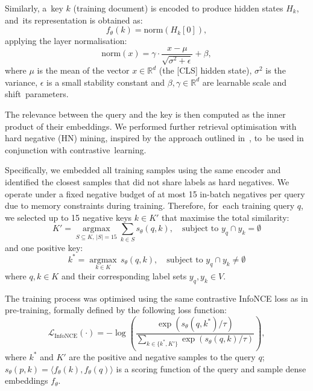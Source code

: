 \documentclass[make,article,accept,pdftex,moreauthors]{Definitions/mdpi}
\begin{document}
Similarly, a~key $k$ (training document) is encoded to produce hidden states $H_k$, and~its representation is obtained as:
\begin{equation}
f_{\theta}(k) = \text{norm}(H_k[0]),
\end{equation}
applying the layer normalisation:
\begin{equation}
\text{norm}(x) = \gamma \cdot \frac{x - \mu}{\sqrt{\sigma^2 + \epsilon}} + \beta,
\end{equation}
where $\mu$ is the mean of the vector $x \in \mathbb{R}^d$ (the [CLS] hidden state), $\sigma^2$ is the variance, $\epsilon$ is a small stability constant and $\beta, \gamma \in \mathbb{R}^d$ are learnable scale and shift~parameters.

The relevance between the query and the key is then computed as the inner product of their embeddings.
We performed further retrieval optimisation with hard negative (HN) mining, inspired by the approach outlined in~\citep{xiong2021ance}, to~be used in conjunction with contrastive~learning.

Specifically, we embedded all training samples using the same encoder and identified the closest samples that did not share labels as hard negatives. 
We operate under a fixed negative budget of at most 15 in-batch negatives per query due to memory constraints during training.
Therefore, for~each training query $q$, we selected up to 15 negative keys $k \in K'$ that maximise the total similarity:
\begin{equation}
K' = \underset{S \subseteq K,\, |S| = 15}{\operatorname{argmax}} \sum_{k \in S} s_\theta(q, k), \quad \text{subject to } y_q \cap y_k = \emptyset
\end{equation}
and one positive key:
\begin{equation}
k^* = \underset{k \in K}{\operatorname{argmax}}\, s_\theta(q, k), \quad \text{subject to } y_q \cap y_k \neq \emptyset
\end{equation}
where $q, k \in K$ and their corresponding label sets $y_q, y_k \in V$.

The training process was optimised using the same contrastive \mbox{InfoNCE} loss as in pre-training, formally defined by the following loss function:
\begin{equation}
\mathcal{L}_{\operatorname{InfoNCE}}(\cdot) = - \log \left( \frac{\exp(s_{\theta}(q, k^*)/\tau)}{\sum_{k \in \{k^*, K'\}} \exp(s_{\theta}(q, k)/\tau)} \right),
\end{equation}
where $k^*$ and $K'$ are the positive and negative samples to the query $q$; $s_{\theta}(p, k) = \langle f_{\theta}(k), f_{\theta}(q) \rangle$ is a scoring function of the query and sample dense embeddings $f_{\theta}$.
\end{document}
